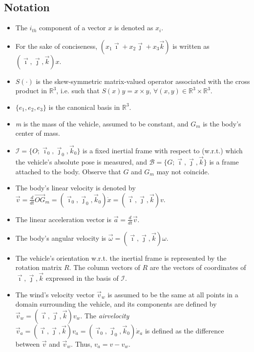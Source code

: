 \documentclass[twocolumn]{autart}
\theoremstyle{definition}
\theoremstyle{definition}
\begin{document}
\subsection{Notation}
\label{sec:notation}
\begin{itemize}
 \item The $i_{th}$ component of a vector $x$ is denoted as $x_i$.
 \item For the sake of conciseness, $(x_1 \vec{\imath} + x_2 \vec{\jmath} +x_3 \vec{k})$ is written as $(\vec{\imath},\vec{\jmath},\vec{k})x$.
 \item $S(\cdot)$ is the skew-symmetric matrix-valued operator associated with the cross product in $\mathbb{R}^3$, i.e. such that $S(x)y=x \times y$, $\forall (x,y) \in \mathbb{R}^3 \times \mathbb{R}^3$.
 \item $\{e_1,e_2,e_3\}$ is the canonical basis in $\mathbb{R}^3$.
\item \emph{m} is the mass of the vehicle, assumed to be constant, and $G_m$ is the body's center of mass.
 \item $\mathcal{I} = \{O;\vec{\imath}_0,\vec{\jmath}_0,\vec{k}_0\}$ is a fixed inertial frame with respect to (w.r.t.) which the vehicle's absolute pose is measured,
and $\mathcal{B} = \{G;\vec{\imath},\vec{\jmath},\vec{k}\}$ is a frame attached to the body. Observe that $G$ and $G_m$ may not coincide.



\item The body's linear velocity is denoted by $\vec{v} =\frac{d}{dt}\vec{OG}_m= (\vec{\imath}_0,\vec{\jmath}_0,\vec{k}_0)\dot{x}= (\vec{\imath},\vec{\jmath},\vec{k})v$.
\item The linear acceleration vector is $\vec{a}=\frac{d}{dt}\vec{v}$.
\item The body's angular velocity is $\vec{\omega}=(\vec{\imath},\vec{\jmath},\vec{k})\omega$.
\item The vehicle's orientation w.r.t. the inertial frame is represented by the rotation matrix $R$. The column vectors of $R$ are the vectors of coordinates of
$\vec{\imath},\vec{\jmath},\vec{k}$ expressed in the basis of  $\mathcal{I}$.
\item The wind's velocity vector $\vec{v}_w$ is assumed to be the same at all points in a domain surrounding the vehicle, and its components are defined by $\vec{v}_w = (\vec{\imath}, \vec{\jmath}, \vec{k})v_w$. The \emph{airvelocity} $\vec{v}_a  {=} (\vec{\imath},\vec{\jmath},\vec{k})v_a{=}(\vec{\imath}_0,\vec{\jmath}_0,\vec{k}_0)\dot{x}_a$ is defined as the difference between $\vec{v}$ and $\vec{v}_w$. Thus, $v_a = v - v_w$.
\end{itemize}
\end{document}

